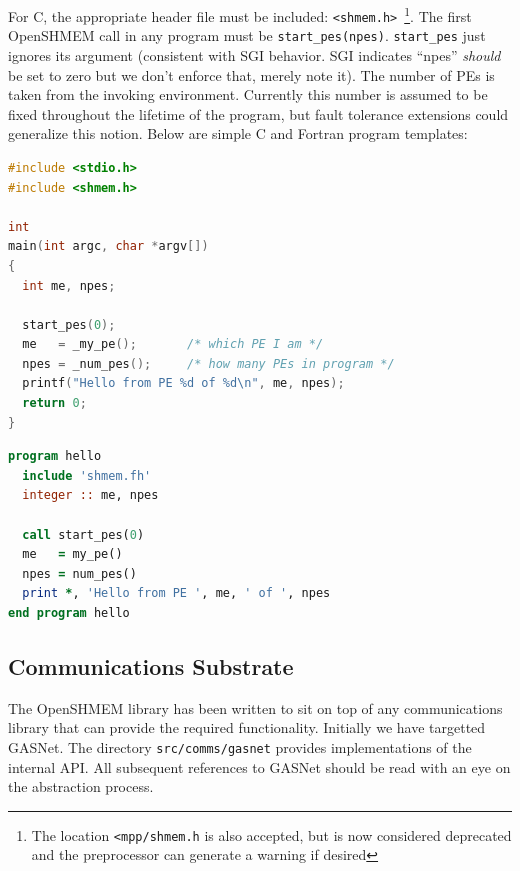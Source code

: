 \documentclass[english]{article}
\begin{document}
For C, the appropriate header file must be included:
\texttt{<shmem.h>}~\footnote{The location \texttt{<mpp/shmem.h} is
  also accepted, but is now considered deprecated and the preprocessor
  can generate a warning if desired}.  The first OpenSHMEM call in any
program must be \texttt{start\_pes(npes)}.  \texttt{start\_pes} just
ignores its argument (consistent with SGI behavior. SGI indicates
``npes'' \emph{should} be set to zero but we don't enforce that,
merely note it). The number of PEs is taken from the invoking
environment. Currently this number is assumed to be fixed throughout
the lifetime of the program, but fault tolerance extensions could
generalize this notion. Below are simple C and Fortran program
templates:

\vspace{0.1in}
\begin{minipage}{0.75\linewidth}
\begin{lstlisting}[language=C,caption={Simple C ``hello world'' program}]
#include <stdio.h>
#include <shmem.h>

int
main(int argc, char *argv[])
{
  int me, npes;

  start_pes(0);
  me   = _my_pe();       /* which PE I am */
  npes = _num_pes();     /* how many PEs in program */
  printf("Hello from PE %d of %d\n", me, npes);
  return 0;
}
\end{lstlisting}
\end{minipage}

\vspace{0.1in}

\begin{minipage}{0.75\linewidth}
\begin{lstlisting}[language=Fortran,caption={Simple Fortran ``hello world'' program}]
program hello
  include 'shmem.fh'
  integer :: me, npes

  call start_pes(0)
  me   = my_pe()
  npes = num_pes()
  print *, 'Hello from PE ', me, ' of ', npes
end program hello
\end{lstlisting}
\end{minipage}

\subsection{Communications Substrate}

The OpenSHMEM library has been written to sit on top of any
communications library that can provide the required
functionality. Initially we have targetted GASNet. The directory
\texttt{src/comms/gasnet} provides implementations of the internal
API. All subsequent references to GASNet should be read with an eye on
the abstraction process.
\end{document}
